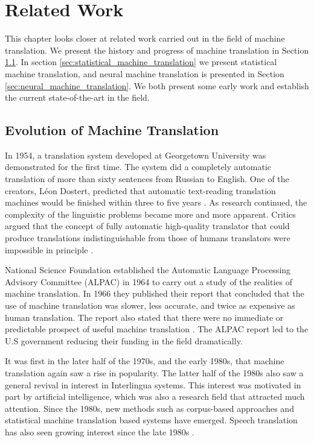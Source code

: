 
\chapter{Related Work}
\label{ch:related_work}
This chapter looks closer at related work carried out in the field of machine translation. We present the history and progress of machine translation in Section \ref{sec:natural_language_processing}. In section \ref{sec:statistical_machine_translation} we present statistical machine translation, and neural machine translation is presented in Section \ref{sec:neural_machine_translation}. We both present some early work and establish the current state-of-the-art in the field.


\section{Evolution of Machine Translation}
\label{sec:natural_language_processing}
In 1954, a translation system developed at Georgetown University was demonstrated for the first time. The system did a completely automatic translation of more than sixty sentences from Russian to English. One of the creators, Léon Dostert, predicted that automatic text-reading translation machines would be finished within three to five years \citep{hutchins1997first}. As research continued, the complexity of the linguistic problems became more and more apparent. Critics argued that the concept of fully automatic high-quality translator that could produce translations indistinguishable from those of humans translators were impossible in principle \citep{hutchins2007machine}. 

National Science Foundation established the Automatic Language Processing Advisory Committee (ALPAC) in 1964 to carry out a study of the realities of machine translation. In 1966 they published their report that concluded that the use of machine translation was slower, less accurate, and twice as expensive as human translation. The report also stated that there were no immediate or predictable prospect of useful machine translation \citep{hutchins2007machine, national1966language, koehn2010statistical}. The ALPAC report led to the U.S government reducing their funding in the field dramatically.

It was first in the later half of the 1970s, and the early 1980s, that machine translation again saw a rise in popularity. The latter half of the 1980s also saw a general revival in interest in Interlingua systems. This interest was motivated in part by artificial intelligence, which was also a research field that attracted much attention. Since the 1980s, new methods such as corpus-based approaches and statistical machine translation based systems have emerged. Speech translation has also seen growing interest since the late 1980s \citep{hutchins2007machine}.

